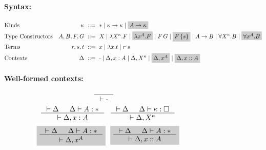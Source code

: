 \begin{figure}
\begin{framed}
\paragraph{Syntax:}
\begin{align*}
&\text{Kinds}
 	& \kappa		&~ ::= ~ *
				\mid \kappa -> \kappa
				\mid \newFi{A -> \kappa}
\\
&\text{Type Constructors}
	& A,B,F,G		&~ ::= ~ X
				\mid \lambda X^\kappa.F
				\mid \newFi{\lambda x^A.F}
				\mid F\,G
				\mid \newFi{F\,\{s\}}
				\mid A -> B
				\mid \forall X^\kappa . B
				\mid \newFi{\forall x^A . B}
\\
&\text{Terms}
	& r,s,t			&~ ::= ~ x \mid \lambda x.t \mid r\;s
\\
&\text{Contexts}
	& \Delta		&~ ::= ~ \cdot
				\mid \Delta, x : A
				\mid \Delta, X^\kappa
				\mid \newFi{\Delta, x^A}
				\mid \newFi{\Delta, x :: A}
\end{align*}

\noindent
\begin{minipage}{.45\textwidth}
\paragraph{Well-formed contexts:}
\[\!\!\!\!\!\!\!\!\!\!\!\!\!\!\!
   \inference{}{|- \cdot} \]
\[\!\!\!\!\!\!\!\!
   \inference{|- \Delta & \Delta |- A:*}{|- \Delta,x:A}
 ~~
   \inference{|- \Delta & \Delta |- \kappa:\square}{|- \Delta,X^\kappa}
\]
\[\!\!\!\!\!\!\!\! \newFi{
   \inference{|- \Delta & \Delta |- A:*}{|- \Delta,x^A} }
 ~~ \newFi{
   \inference{|- \Delta & \Delta |- A:*}{|- \Delta,x::A} }
\]
\end{minipage}~~
~~
\begin{minipage}{.15\textwidth}

\end{minipage}
\end{framed}
\end{figure}
